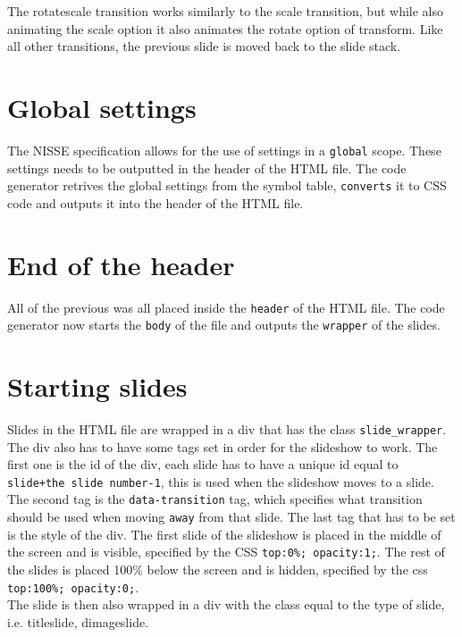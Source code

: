 The rotatescale transition works similarly to the scale transition, but while also animating the scale option it also animates the rotate option of transform. Like all other transitions, the previous slide is moved back to the slide stack.\\

\section{Global settings}
The NISSE specification allows for the use of settings in a \texttt{global} scope. These settings needs to be outputted in the header of the HTML file. The code generator retrives the global settings from the symbol table, \texttt{converts} it to CSS code and outputs it into the header of the HTML file.

\section{End of the header}
All of the previous was all placed inside the \texttt{header} of the HTML file. The code generator now starts the \texttt{body} of the file and outputs the \texttt{wrapper} of the slides.

\section{Starting slides}
Slides in the HTML file are wrapped in a div that has the class \texttt{slide\_wrapper}. The div also has to have some tags set in order for the slideshow to work. The first one is the id of the div, each slide has to have a unique id equal to \texttt{slide+the slide number-1}, this is used when the slideshow moves to a slide. The second tag is the \texttt{data-transition} tag, which specifies what transition should be used when moving \texttt{away} from that slide. The last tag that has to be set is the style of the div. The first slide of the slideshow is placed in the middle of the screen and is visible, specified by the CSS \texttt{top:0\%; opacity:1;}. The rest of the slides is placed 100\% below the screen and is hidden, specified by the css \texttt{top:100\%; opacity:0;}. \\
The slide is then also wrapped in a div with the class equal to the type of slide, i.e. titleslide, dimageslide.

